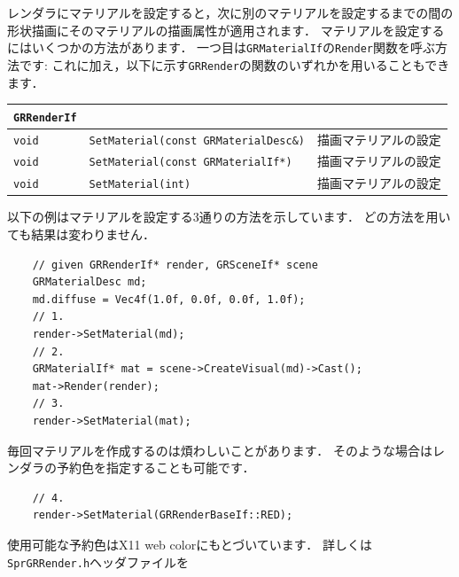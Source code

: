\KLUDGE レンダラにマテリアルを設定すると，次に別のマテリアルを設定するまでの間の
\KLUDGE 形状描画にそのマテリアルの描画属性が適用されます．
\KLUDGE マテリアルを設定するにはいくつかの方法があります．
\KLUDGE 一つ目は\texttt{GRMaterialIf}\KLUDGE の\texttt{Render}\KLUDGE 関数を呼ぶ方法です:
\KLUDGE これに加え，以下に示す\texttt{GRRender}\KLUDGE の関数のいずれかを用いることもできます．
\begin{center}
\begin{tabular}{p{.1\hsize}p{.5\hsize}p{.3\hsize}}
\texttt{GRRenderIf}																\\ \midrule
\texttt{void} & \texttt{SetMaterial(const GRMaterialDesc\&)}		& \KLUDGE 描画マテリアルの設定	\\
\texttt{void} & \texttt{SetMaterial(const GRMaterialIf*)}			& \KLUDGE 描画マテリアルの設定	\\
\texttt{void} & \texttt{SetMaterial(int)}							& \KLUDGE 描画マテリアルの設定	\\
\end{tabular}
\end{center}
\KLUDGE 以下の例はマテリアルを設定する3\KLUDGE 通りの方法を示しています．
\KLUDGE どの方法を用いても結果は変わりません．
\begin{verbatim}
    // given GRRenderIf* render, GRSceneIf* scene
    GRMaterialDesc md;
    md.diffuse = Vec4f(1.0f, 0.0f, 0.0f, 1.0f);
    // 1.
    render->SetMaterial(md);
    // 2.
    GRMaterialIf* mat = scene->CreateVisual(md)->Cast();
    mat->Render(render);
    // 3.
    render->SetMaterial(mat);
\end{verbatim}
\KLUDGE 毎回マテリアルを作成するのは煩わしいことがあります．
\KLUDGE そのような場合はレンダラの予約色を指定することも可能です．
\begin{verbatim}
    // 4.
    render->SetMaterial(GRRenderBaseIf::RED);
\end{verbatim}
\KLUDGE 使用可能な予約色はX11 web color\KLUDGE にもとづいています．
\KLUDGE 詳しくは\texttt{SprGRRender.h}\KLUDGE ヘッダファイルを


